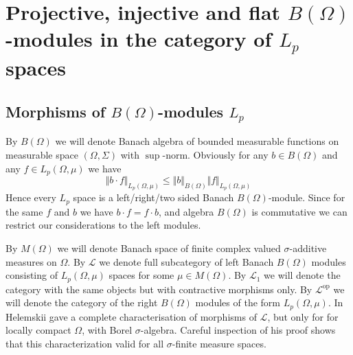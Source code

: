 \documentclass[12pt]{article}
\begin{document}
\newline


\section{
  Projective, injective and flat
  \texorpdfstring{$B(\Omega)$}{B (Omega)}-modules in
  the category of \texorpdfstring{$L_p$}{Lp} spaces
 }


\subsection{
    Morphisms of \texorpdfstring{$B(\Omega)$}{B (Omega)}-modules
    \texorpdfstring{$L_p$}{Lp}
}

By $B(\Omega)$ we will denote Banach algebra of bounded measurable functions
on measurable space $(\Omega,\Sigma)$ with $\sup$-norm. Obviously for
any $b\in B(\Omega)$ and any $f\in L_p(\Omega,\mu)$ we have
$$
    \Vert b\cdot f\Vert_{L_p(\Omega,\mu)} \leq\Vert b\Vert_{B(\Omega)}\Vert
    f\Vert_{L_p(\Omega,\mu)}
$$
Hence every $L_p$ space is a left/right/two sided Banach $B(\Omega)$-module.
Since for the same $f$ and $b$ we have $b\cdot f=f\cdot b$, and
algebra $B(\Omega)$ is commutative we can restrict our considerations
to the left modules.

By $M(\Omega)$ we will denote Banach space of finite complex valued
$\sigma$-additive measures on $\Omega$. By $\mathscr{L}$ we denote full
subcategory of left Banach $B(\Omega)$ modules consisting of $L_p(\Omega,\mu)$
spaces for some $\mu\in M(\Omega)$. By $\mathscr{L}_1$ we will denote the
category with the same objects but with contractive morphisms only.
By $\mathscr{L}^{\operatorname{op}}$ we will denote the category of the right
$B(\Omega)$ modules of the form $L_p(\Omega,\mu)$.
In~\cite{HelTensProdAndMultModLp} Helemskii gave a complete characterisation of
morphisms of $\mathscr{L}$, but only for for locally compact $\Omega$, with
Borel $\sigma$-algebra. Careful inspection of his proof shows that this
characterization valid for all $\sigma$-finite measure spaces.
\end{document}
